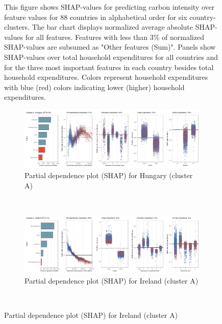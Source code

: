 \begin{figure}[ht!]
    \begin{subcaption2}
     This figure shows SHAP-values for predicting carbon intensity over feature values for 88 countries in alphabetical order for six country-clusters. The bar chart displays normalized average absolute SHAP-values for all features. Features with less than 3\% of normalized SHAP-values are subsumed as "Other features (Sum)". Panels show SHAP-values over total household expenditures for all countries and for the three most important features in each country besides total household expenditures. Colors represent household expenditures with blue (red) colors indicating lower (higher) household expenditures.
     \end{subcaption2}
\end{figure}

\begin{figure}[ht!]\ContinuedFloat
    \centering
   \begin{subfigure}[b]{\textwidth}
     \centering
         \caption{Partial dependence plot (SHAP) for Hungary (cluster A)}
         \label{fig:5b_HUN}
         \includegraphics[width=\textwidth]{Figure 5b/Figure_5b_HUN}
    \end{subfigure}
    \\
    \vspace{0.5cm}
    \begin{subfigure}[b]{\textwidth}
      \centering
         \caption{Partial dependence plot (SHAP) for Ireland (cluster A)}
         \label{fig:5b_IRL}
         \includegraphics[width=\textwidth]{Figure 5b/Figure_5b_IRL}   
     \end{subfigure}
    \\

\end{figure}

